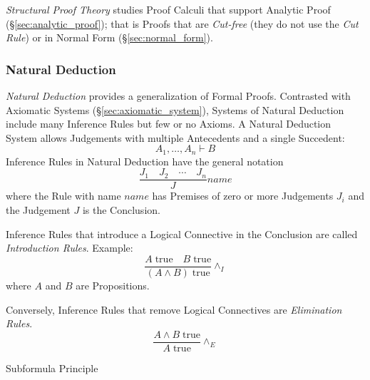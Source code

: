 \emph{Structural Proof Theory} studies Proof Calculi that support
Analytic Proof (\S\ref{sec:analytic_proof}); that is Proofs that are
\emph{Cut-free} (they do not use the \emph{Cut Rule}) or in Normal
Form (\S\ref{sec:normal_form}).



\subsubsection{Natural Deduction}\label{sec:natural_deduction}
\cite{prawitz65}

\emph{Natural Deduction} provides a generalization of Formal Proofs.
Contrasted with Axiomatic Systems (\S\ref{sec:axiomatic_system}),
Systems of Natural Deduction include many Inference Rules but few or
no Axioms. A Natural Deduction System allows Judgements with multiple
Antecedents and a single Succedent:
\[
  A_1,\ldots,A_n \vdash B
\]
Inference Rules in Natural Deduction have the general notation
\[
  {
    \frac{J_1 \quad J_2 \quad \cdots \quad J_n}
    {J}
  } name
\]
where the Rule with name $name$ has Premises of zero or more
Judgements $J_i$ and the Judgement $J$ is the Conclusion.

Inference Rules that introduce a Logical Connective in the Conclusion
are called \emph{Introduction Rules}. Example:
\[
  {
    \frac{A\;\mathrm{true} \quad B\;\mathrm{true}}
    {(A \wedge B)\;\mathrm{true}}
  } \wedge_I
\]
where $A$ and $B$ are Propositions.

Conversely, Inference Rules that remove Logical Connectives are
\emph{Elimination Rules}.
\[
  {
    \frac{A \wedge B\;\mathrm{true}}
    {A\;\mathrm{true}}
  } \wedge_E
\]

Subformula Principle


